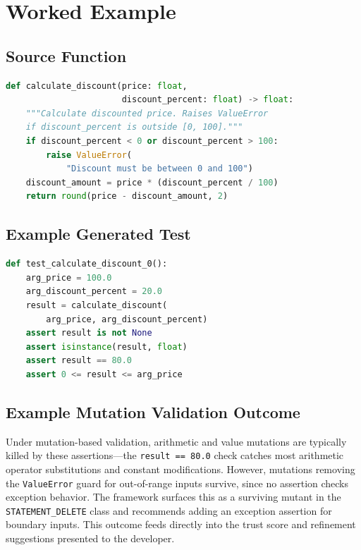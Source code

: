 \documentclass[conference]{IEEEtran}
\begin{document}
\section{Worked Example}

\subsection{Source Function}

\begin{lstlisting}[language=Python]
def calculate_discount(price: float,
                       discount_percent: float) -> float:
    """Calculate discounted price. Raises ValueError
    if discount_percent is outside [0, 100]."""
    if discount_percent < 0 or discount_percent > 100:
        raise ValueError(
            "Discount must be between 0 and 100")
    discount_amount = price * (discount_percent / 100)
    return round(price - discount_amount, 2)
\end{lstlisting}

\subsection{Example Generated Test}

\begin{lstlisting}[language=Python]
def test_calculate_discount_0():
    arg_price = 100.0
    arg_discount_percent = 20.0
    result = calculate_discount(
        arg_price, arg_discount_percent)
    assert result is not None
    assert isinstance(result, float)
    assert result == 80.0
    assert 0 <= result <= arg_price
\end{lstlisting}

\subsection{Example Mutation Validation Outcome}

Under mutation-based validation, arithmetic and value mutations are typically killed by these assertions---the \texttt{result == 80.0} check catches most arithmetic operator substitutions and constant modifications. However, mutations removing the \texttt{ValueError} guard for out-of-range inputs survive, since no assertion checks exception behavior. The framework surfaces this as a surviving mutant in the \texttt{STATEMENT\_DELETE} class and recommends adding an exception assertion for boundary inputs. This outcome feeds directly into the trust score and refinement suggestions presented to the developer.
\end{document}
